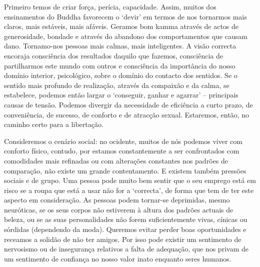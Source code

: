 Primeiro temos de criar força, perícia, capacidade. Assim, muitos dos
ensinamentos do Buddha favorecem o `devir' em termos de nos tornarmos mais
claros, mais estáveis, mais afáveis.
Geramos bom kamma através de actos de generosidade, bondade e através do abandono dos
comportamentos que causam dano. Tornamo-nos pessoas mais calmas, mais
inteligentes. A visão correcta encoraja consciência dos resultados daquilo que
fazemos, consciência de partilharmos este mundo com outros e consciência da
importância do nosso domínio interior, psicológico, sobre o domínio do contacto
dos sentidos. Se o sentido mais profundo de realização, através da compaixão e
da calma, se estabelece, podemos então largar o `conseguir, ganhar e agarrar' --
principais causas de tensão. Podemos divergir da necessidade de eficiência a
curto prazo, de conveniência, de sucesso, de conforto e de atracção sexual.
Estaremos, então, no caminho certo para a libertação.

Consideremos o cenário social: no ocidente, muitos de nós podemos viver com
conforto físico, contudo, por estamos constantemente a ser confrontados com
comodidades mais refinadas ou com alterações constantes nos padrões de
comparação, não existe um grande contentamento. E existem também pressões
sociais e de grupo. Uma pessoa pode muito bem sentir que o seu emprego está em
risco se a roupa que está a usar não for a `correcta', de forma que tem de ter
este aspecto em consideração. As pessoas podem tornar-se deprimidas, mesmo
neuróticas, se os seus corpos não estiverem à altura dos padrões actuais de
beleza, ou se as suas personalidades não forem suficientemente vivas, cínicas ou
sórdidas (dependendo da moda). Queremos evitar perder boas oportunidades e
receamos a solidão de não ter amigos. Por isso pode existir um sentimento de
nervosismo ou de insegurança relativos a falta de adequação, que nos privam de
um sentimento de confiança no nosso valor inato enquanto seres humanos.

